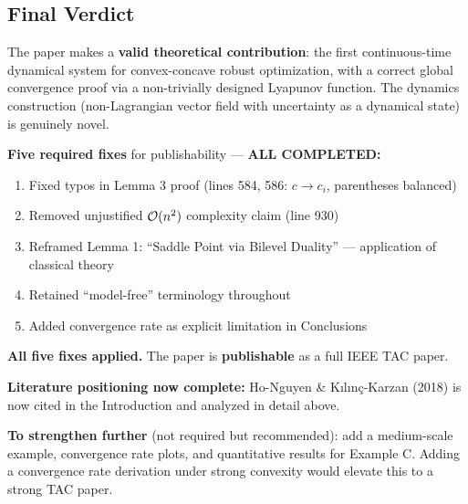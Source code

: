 \documentclass[journal,twoside,web]{ieeecolor}
\begin{document}
\subsection*{Final Verdict}

The paper makes a \textbf{valid theoretical contribution}: the first continuous-time dynamical system for convex-concave robust optimization, with a correct global convergence proof via a non-trivially designed Lyapunov function. The dynamics construction (non-Lagrangian vector field with uncertainty as a dynamical state) is genuinely novel.

\textbf{Five required fixes} for publishability --- \textbf{ALL COMPLETED:}
\begin{enumerate}
\item[\checkmark] Fixed typos in Lemma 3 proof (lines 584, 586: $c \to c_i$, parentheses balanced)
\item[\checkmark] Removed unjustified ${\cal O}(n^2)$ complexity claim (line 930)
\item[\checkmark] Reframed Lemma 1: ``Saddle Point via Bilevel Duality'' --- application of classical theory
\item[\checkmark] Retained ``model-free'' terminology throughout
\item[\checkmark] Added convergence rate as explicit limitation in Conclusions
\end{enumerate}

\textbf{All five fixes applied.} The paper is \textbf{publishable} as a full IEEE TAC paper.

\textbf{Literature positioning now complete:} Ho-Nguyen \& K{\i}l{\i}n\c{c}-Karzan (2018) is now cited in the Introduction and analyzed in detail above.

\textbf{To strengthen further} (not required but recommended): add a medium-scale example, convergence rate plots, and quantitative results for Example C. Adding a convergence rate derivation under strong convexity would elevate this to a strong TAC paper.
\end{document}
